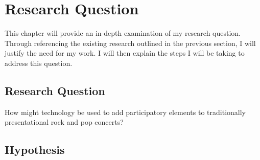 \chapter{Research Question}

This chapter will provide an in-depth examination of my research question. Through referencing the existing research outlined in the previous section, I will justify the need for my work. I will then explain the steps I will be taking to address this question.

\section{Research Question}

How might technology be used to add participatory elements to traditionally presentational rock and pop concerts?



\section{Hypothesis}

